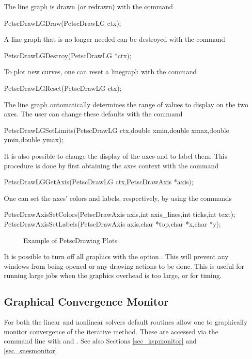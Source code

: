 {{{The line graph is drawn (or redrawn) with the command
\begin{tabbing}
  PetscDrawLGDraw(PetscDrawLG ctx);
\end{tabbing}
A line graph that is no longer needed can be destroyed with the
command
\begin{tabbing}
  PetscDrawLGDestroy(PetscDrawLG *ctx);
\end{tabbing}
To plot new curves, one can reset a linegraph with the
command
\begin{tabbing}
  PetscDrawLGReset(PetscDrawLG ctx);
\end{tabbing}
The line graph automatically determines the range of values to
display on the two axes.  The user can change these defaults with the
command
\begin{tabbing}
  PetscDrawLGSetLimits(PetscDrawLG ctx,double xmin,double xmax,double ymin,double ymax);
\end{tabbing}

It is also possible to change the display of the axes and to label
them. This procedure is done by first obtaining the axes context with the
command  
\begin{tabbing}
  PetscDrawLGGetAxis(PetscDrawLG ctx,PetscDrawAxis *axis);
\end{tabbing}
One can set the axes' colors and labels, respectively, by using the
commands
\begin{tabbing}
  PetscDrawAxisSetColors(PetscDrawAxis axis,int axis\_lines,int ticks,int text);\\
  PetscDrawAxisSetLabels(PetscDrawAxis axis,char *top,char *x,char *y);
\end{tabbing}

\begin{figure}[H]
{\small
{}
}
\caption{Example of PetscDrawing Plots}
\label{fig_plot}
\end{figure}

It is possible to turn off all graphics with the option 
. This
will prevent any windows from being opened or any drawing actions to be done.
This is useful for running large jobs when the graphics overhead is too
large, or for timing.

\subsection{Graphical Convergence Monitor}
For both the linear and nonlinear solvers default routines
allow one to graphically monitor convergence of the iterative method.
These are accessed via the command line with
 and . 
 See also Sections \ref{sec_kspmonitor} and
\ref{sec_snesmonitor}.

}}}
